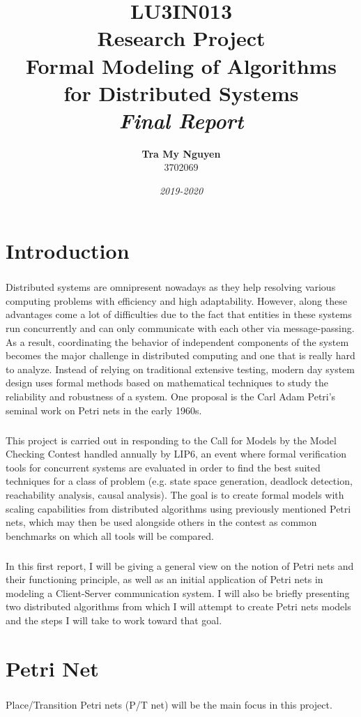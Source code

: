 \documentclass{article}
\title{\textbf{{\large LU3IN013}\\Research Project}\\{\Huge Formal Modeling of Algorithms\\for Distributed Systems}\\\textit{Final Report}}
\author{\Large\textbf{Tra My Nguyen}\\{\large 3702069}}
\date{\textit{2019-2020}}
\begin{document}
	
	\maketitle
	\newpage
	
	\section{Introduction}
	
	\subparagraph{}Distributed systems are omnipresent nowadays as they help resolving various computing problems with efficiency and high adaptability. However, along these advantages come a lot of difficulties due to the fact that entities in these systems run concurrently and can only communicate with each other via message-passing. As a result, coordinating the behavior of independent components of the system becomes the major challenge in distributed computing and one that is really hard to analyze. Instead of relying on traditional extensive testing, modern day system design uses formal methods based on mathematical techniques to study the reliability and robustness of a system. One proposal is the Carl Adam Petri's seminal work on Petri nets in the early 1960s.
	\subparagraph{}This project is carried out in responding to the Call for Models by the Model Checking Contest handled annually by LIP6, an event where formal verification tools for concurrent systems are evaluated in order to find the best suited techniques for a class of problem (e.g. state space generation, deadlock detection, reachability analysis, causal analysis). The goal is to create formal models with scaling capabilities from distributed algorithms using previously mentioned Petri nets, which may then be used alongside others in the contest as common benchmarks on which all tools will be compared.
	\subparagraph{}In this first report, I will be giving a general view on the notion of Petri nets and their functioning principle, as well as an initial application of Petri nets in modeling a Client-Server communication system. I will also be briefly presenting two distributed algorithms from which I will attempt to create Petri nets models and the steps I will take to work toward that goal.
	
	\section{Petri Net}
	\subparagraph{}Place/Transition Petri nets (P/T net) will be the main focus in this project.
			
\end{document}
